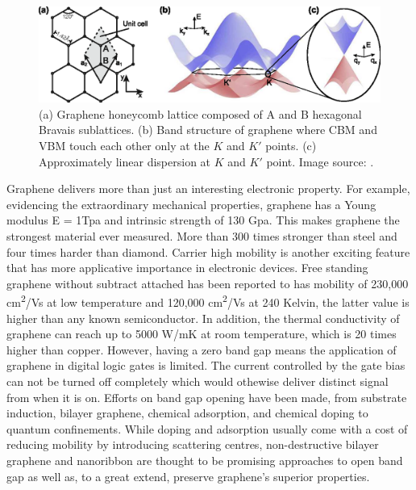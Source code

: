 \begin{figure}[htbp!] 
\centering  
\includegraphics[width=\textwidth]{gra_lat_band.eps}
\caption[Graphene lattice and band structure.]{(a) Graphene honeycomb lattice composed of A and B hexagonal Bravais sublattices. (b) Band structure of graphene where CBM and VBM touch each other only at the $K$ and $K'$ points. (c) Approximately linear dispersion at $K$ and $K'$ point. Image source: \cite{Guttinger2012}. }  
\label{fig:gra_band}
\end{figure} 

Graphene delivers more than just an interesting electronic property. For example, evidencing the extraordinary mechanical properties, graphene has a Young modulus E = 1Tpa and intrinsic strength of 130 Gpa\cite{Lee385}. This makes graphene the strongest material ever measured. More than 300 times stronger than steel and four times harder than diamond. Carrier high mobility is another exciting feature that has more applicative importance in electronic devices. Free standing graphene without subtract attached has been reported to has mobility of 230,000 \si{cm^2/Vs} at low temperature\cite{Bolotin2008a} and 120,000 \si{cm^2/Vs} at 240 Kelvin, the latter value is higher than any known semiconductor\cite{Bolotin2008b}. In addition, the thermal conductivity of graphene can reach up to 5000 \si{W/mK} at room temperature, which is 20 times higher than copper\cite{balandin2008}. However, having a zero band gap means the application of graphene in digital logic gates is limited. The current controlled by the gate bias can not be turned off completely which would othewise deliver distinct signal from when it is on. Efforts on band gap opening have been made, from substrate induction\cite{Ci2010,zhou2007}, bilayer graphene\cite{mccann2006,castro2007}, chemical adsorption\cite{Elias2009,Jeon2011}, and chemical doping\cite{zhou2008} to quantum confinements\cite{Nakada1996,Barone2006}.  While doping and adsorption usually come with a cost of reducing mobility by introducing scattering centres, non-destructive bilayer graphene and nanoribbon are thought to be promising approaches to open band gap as well as, to a great extend, preserve graphene's superior properties.

